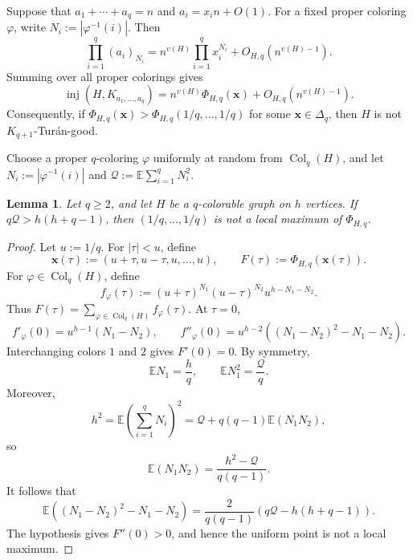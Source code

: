 \documentclass[11pt]{article}
\numberwithin{equation}{section}
\newtheorem{lemma}[theorem]{Lemma}
\theoremstyle{definition}
\theoremstyle{remark}
\newcommand{\inj}{\operatorname{inj}}
\newcommand{\Col}{\operatorname{Col}}
\newcommand{\E}{\mathbb E}
\begin{document}
Suppose that $a_1+\cdots+a_q=n$ and $a_i=x_i n+O(1)$. For a fixed proper coloring $\varphi$, write $N_i:=|\varphi^{-1}(i)|$. Then
\[
\prod_{i=1}^q(a_i)_{N_i}
=n^{v(H)}\prod_{i=1}^q x_i^{N_i}+O_{H,q}(n^{v(H)-1}).
\]
Summing over all proper colorings gives
\begin{equation}
\label{eq:color-polynomial-asymptotic}
\inj(H,K_{a_1,\ldots,a_q})
=n^{v(H)}\Phi_{H,q}(\boldsymbol{x})+O_{H,q}(n^{v(H)-1}).
\end{equation}
Consequently, if $\Phi_{H,q}(\boldsymbol{x})>\Phi_{H,q}(1/q,\ldots,1/q)$ for some $\boldsymbol{x}\in\Delta_q$, then $H$ is not $K_{q+1}$-Tur\'an-good.

Choose a proper $q$-coloring $\varphi$ uniformly at random from $\Col_q(H)$, and let $N_i:=|\varphi^{-1}(i)|$ and $\mathcal Q:=\E\sum_{i=1}^qN_i^2$.

\begin{lemma}
\label{lem:Hessian-coloring}
Let $q\ge 2$, and let $H$ be a $q$-colorable graph on $h$ vertices. If $q\mathcal Q>h(h+q-1)$, then $(1/q,\ldots,1/q)$ is not a local maximum of $\Phi_{H,q}$.
\end{lemma}

\begin{proof}
Let $u:=1/q$. For $|\tau|<u$, define
\[
\boldsymbol{x}(\tau):=(u+\tau,u-\tau,u,\ldots,u),
\qquad
F(\tau):=\Phi_{H,q}(\boldsymbol{x}(\tau)).
\]
For $\varphi\in\Col_q(H)$, define
\[
f_\varphi(\tau):=(u+\tau)^{N_1}(u-\tau)^{N_2}u^{h-N_1-N_2}.
\]
Thus $F(\tau)=\sum_{\varphi\in\Col_q(H)}f_\varphi(\tau)$. At $\tau=0$,
\[
f'_\varphi(0)=u^{h-1}(N_1-N_2),\qquad
f''_\varphi(0)=u^{h-2}\left((N_1-N_2)^2-N_1-N_2\right).
\]
Interchanging colors $1$ and $2$ gives $F'(0)=0$. By symmetry,
\[
\E N_1=\frac hq,\qquad \E N_1^2=\frac{\mathcal Q}q.
\]
Moreover,
\[
h^2=\E\left(\sum_{i=1}^qN_i\right)^2
=\mathcal Q+q(q-1)\E(N_1N_2),
\]
so
\[
\E(N_1N_2)=\frac{h^2-\mathcal Q}{q(q-1)}.
\]
It follows that
\[
\E\left((N_1-N_2)^2-N_1-N_2\right)
=\frac{2}{q(q-1)}\left(q\mathcal Q-h(h+q-1)\right).
\]
The hypothesis gives $F''(0)>0$, and hence the uniform point is not a local maximum.
\end{proof}
\end{document}
